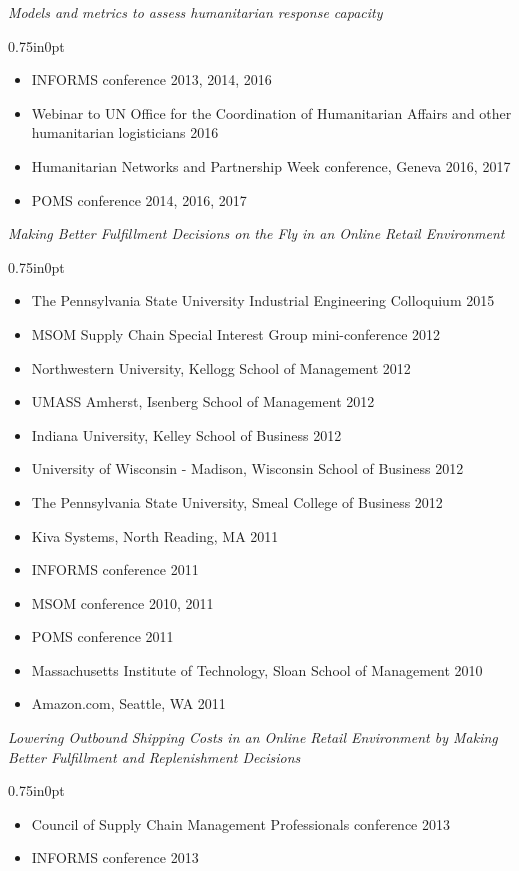 \documentclass[letterpaper,11pt,oneside]{article}
\newcommand\myIndent{0.75in}
\newcommand\myParSkip{3pt}
\newcommand\myHangIndent{1in}
\newcommand{\NiceIndent}{ \parindent=\myIndent \hangindent=\myHangIndent }
\newenvironment{miniListBullet}
    {
        \begin{adjustwidth}{\myIndent}{0pt}
        \setlength{\parskip}{0pt}%
        \renewcommand\labelitemi{{\boldmath$\cdot$}}
        \begin{itemize}
        \setlength\itemsep{0em}
    }
    {
        \end{itemize}
        \setlength{\parskip}{\myParSkip}%
        \end{adjustwidth}
    }
\begin{document}
\NiceIndent \textit{Models and metrics to assess humanitarian response capacity}
\begin{miniListBullet}
    \item INFORMS conference 2013, 2014, 2016
    \item Webinar to UN Office for the Coordination of Humanitarian Affairs and other humanitarian logisticians 2016
    \item Humanitarian Networks and Partnership Week conference, Geneva 2016, 2017
    \item POMS conference 2014, 2016, 2017
\end{miniListBullet}



\NiceIndent \textit{Making Better Fulfillment Decisions on the Fly in an Online Retail Environment}
\begin{miniListBullet}
    \item The Pennsylvania State University Industrial Engineering Colloquium 2015
    \item MSOM Supply Chain Special Interest Group mini-conference 2012
    \item Northwestern University, Kellogg School of Management 2012
    \item UMASS Amherst, Isenberg School of Management 2012
    \item Indiana University, Kelley School of Business 2012
    \item University of Wisconsin - Madison, Wisconsin School of Business 2012
    \item The Pennsylvania State University, Smeal College of Business 2012
    \item Kiva Systems, North Reading, MA 2011
    \item INFORMS conference 2011
    \item MSOM conference 2010, 2011
    \item POMS conference 2011
    \item Massachusetts Institute of Technology, Sloan School of Management 2010
    \item Amazon.com, Seattle, WA 2011
\end{miniListBullet}    
    
\NiceIndent \textit{Lowering Outbound Shipping Costs in an Online Retail Environment by Making Better Fulfillment and Replenishment Decisions}
\begin{miniListBullet}
    \item Council of Supply Chain Management Professionals conference 2013
    \item INFORMS conference 2013
\end{miniListBullet}
\end{document}
